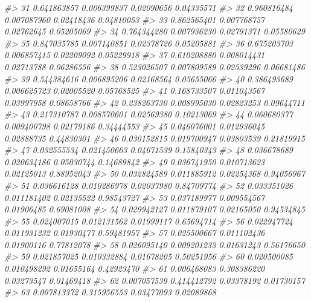 \documentclass[
  oneside]{book}
\newenvironment{Shaded}{\begin{snugshade}}{\end{snugshade}}
\newcommand{\CommentTok}[1]{\textcolor[rgb]{0.56,0.35,0.01}{\textit{#1}}}
\begin{document}
\begin{Shaded}
\begin{Highlighting}[]
\CommentTok{\#\textgreater{} 31 0.641863857 0.006399837 0.02090656 0.04335571}
\CommentTok{\#\textgreater{} 32 0.960816484 0.007087960 0.02418436 0.04810053}
\CommentTok{\#\textgreater{} 33 0.862565401 0.007768757 0.02762645 0.05205069}
\CommentTok{\#\textgreater{} 34 0.764344280 0.007936230 0.02791371 0.05580629}
\CommentTok{\#\textgreater{} 35 0.847035785 0.007140851 0.02378726 0.05205881}
\CommentTok{\#\textgreater{} 36 0.675203703 0.006857415 0.02209092 0.05229918}
\CommentTok{\#\textgreater{} 37 0.610208880 0.008014431 0.02713788 0.06286556}
\CommentTok{\#\textgreater{} 38 0.523026507 0.007809589 0.02539296 0.06681486}
\CommentTok{\#\textgreater{} 39 0.544384616 0.006895206 0.02168564 0.05655066}
\CommentTok{\#\textgreater{} 40 0.386493689 0.006625723 0.02005520 0.05768525}
\CommentTok{\#\textgreater{} 41 0.168733507 0.011043567 0.03997958 0.08658766}
\CommentTok{\#\textgreater{} 42 0.238263730 0.008995030 0.02823253 0.09644711}
\CommentTok{\#\textgreater{} 43 0.217310787 0.008570601 0.02569380 0.10213069}
\CommentTok{\#\textgreater{} 44 0.060680377 0.009400798 0.02179186 0.34444553}
\CommentTok{\#\textgreater{} 45 0.046076001 0.012936045 0.02888735 0.44830301}
\CommentTok{\#\textgreater{} 46 0.030152815 0.019700947 0.03803539 0.21819915}
\CommentTok{\#\textgreater{} 47 0.032555534 0.021450663 0.04671539 0.15840343}
\CommentTok{\#\textgreater{} 48 0.036678689 0.020634186 0.05030744 0.14689842}
\CommentTok{\#\textgreater{} 49 0.036741950 0.010713623 0.02125013 0.88952043}
\CommentTok{\#\textgreater{} 50 0.032824589 0.011885912 0.02254368 0.94056967}
\CommentTok{\#\textgreater{} 51 0.036616128 0.010286978 0.02037980 0.84709774}
\CommentTok{\#\textgreater{} 52 0.033351026 0.011181402 0.02135522 0.98543727}
\CommentTok{\#\textgreater{} 53 0.037189977 0.009554567 0.01906485 0.69081008}
\CommentTok{\#\textgreater{} 54 0.029942127 0.011879107 0.02165050 0.94534845}
\CommentTok{\#\textgreater{} 55 0.024007015 0.012131562 0.01999117 0.65694714}
\CommentTok{\#\textgreater{} 56 0.022947724 0.011931232 0.01930477 0.59481957}
\CommentTok{\#\textgreater{} 57 0.025500667 0.011102436 0.01900116 0.77812078}
\CommentTok{\#\textgreater{} 58 0.026095140 0.009201233 0.01631243 0.56176650}
\CommentTok{\#\textgreater{} 59 0.021857025 0.010332884 0.01678205 0.50251956}
\CommentTok{\#\textgreater{} 60 0.020500085 0.010498292 0.01655164 0.42923470}
\CommentTok{\#\textgreater{} 61 0.006468083 0.308386220 0.03273547 0.01469418}
\CommentTok{\#\textgreater{} 62 0.007057539 0.414412792 0.03378192 0.01730157}
\CommentTok{\#\textgreater{} 63 0.007813372 0.315956553 0.03477093 0.02089868}

\end{Highlighting}
\end{Shaded}
\end{document}
